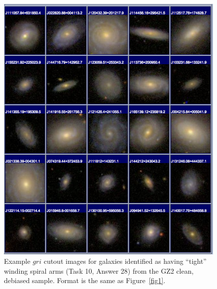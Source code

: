 \documentclass[useAMS,usenatbib]{mn2e}
\begin{document}
\newpage
\clearpage
\begin{figure}
\includegraphics[angle=0,width=7.0in]{figures/gallery/tight.png}
\caption{Example $gri$ cutout images for galaxies identified as having ``tight'' winding spiral arms (Task 10, Answer 28) from the GZ2 clean, debiased sample. Format is the same as Figure~\ref{fig1}.}
\end{figure}
\end{document}
